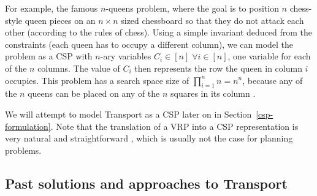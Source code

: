 For example, the famous $n$-queens problem, where the goal is to position $n$ chess-style queen pieces on an $n \times n$ sized chessboard so that they do not attack each other (according to the rules of chess). Using a simple invariant deduced from the constraints (each queen has to occupy a different column),
we can model the problem as a CSP with $n$-ary variables $C_i \in [n]\; \forall i \in [n]$, one variable for each of the $n$ columns. The value of $C_i$ then represents the row the queen in column $i$ occupies. This problem has a search space size of $\prod_{i=1}^n n = n^n$, because any of the $n$ queens can be placed on any of the $n$ squares in its column \citep{Russell1995}.

We will attempt to model Transport as a CSP later on in Section~\ref{csp-formulation}.
Note that the translation of a VRP into a CSP representation is very natural and straightforward \citep[Solution Methods / Constraint Programming]{ResearchGroup2013}, which is usually not the case for planning problems.

\subsection{Past solutions and approaches to Transport}

